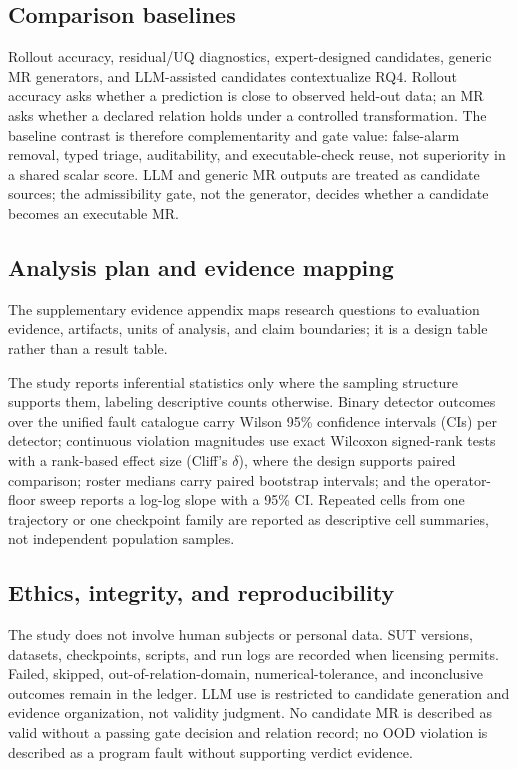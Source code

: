 \documentclass[preprint,12pt,authoryear]{elsarticle}
\begin{document}
\subsection{Comparison baselines}
\label{subsec:baselines}

Rollout accuracy, residual/UQ diagnostics, expert-designed candidates, generic MR generators, and LLM-assisted candidates contextualize RQ4. Rollout accuracy asks whether a prediction is close to observed held-out data; an MR asks whether a declared relation holds under a controlled transformation. The baseline contrast is therefore complementarity and gate value: false-alarm removal, typed triage, auditability, and executable-check reuse, not superiority in a shared scalar score. LLM and generic MR outputs are treated as candidate sources; the admissibility gate, not the generator, decides whether a candidate becomes an executable MR.

\subsection{Analysis plan and evidence mapping}
\label{subsec:rq-evidence}

The supplementary evidence appendix maps research questions to evaluation evidence, artifacts, units of analysis, and claim boundaries; it is a design table rather than a result table.

The study reports inferential statistics only where the sampling structure supports them, labeling descriptive counts otherwise. Binary detector outcomes over the unified fault catalogue carry Wilson 95\% confidence intervals (CIs) per detector; continuous violation magnitudes use exact Wilcoxon signed-rank tests with a rank-based effect size (Cliff's $\delta$), where the design supports paired comparison; roster medians carry paired bootstrap intervals; and the operator-floor sweep reports a log-log slope with a 95\% CI. Repeated cells from one trajectory or one checkpoint family are reported as descriptive cell summaries, not independent population samples.

\subsection{Ethics, integrity, and reproducibility}
\label{subsec:ethics}

The study does not involve human subjects or personal data. SUT versions, datasets, checkpoints, scripts, and run logs are recorded when licensing permits. Failed, skipped, out-of-relation-domain, numerical-tolerance, and inconclusive outcomes remain in the ledger. LLM use is restricted to candidate generation and evidence organization, not validity judgment. No candidate MR is described as valid without a passing gate decision and relation record; no OOD violation is described as a program fault without supporting verdict evidence.
\end{document}
